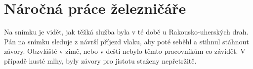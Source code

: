 
\chapter{Náročná práce železničáře}


Na snímku je vidět, jak těžká služba byla v té době u Rakousko-uherských drah.
Pán na snímku sleduje z návrší příjezd vlaku, aby poté seběhl a stihnul
stáhnout závory. Obzvláště v zimě, nebo v dešti nebylo těmto pracovníkům co
závidět. V případě husté mlhy, byly závory pro jistotu staženy nepřetržitě.

